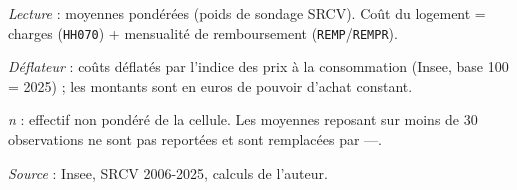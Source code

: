 \documentclass[12pt,a4paper]{article}
\begin{document}
\begin{table}[htbp]
\begin{threeparttable}
\begin{tablenotes}[flushleft]
				\item \textit{Lecture} : moyennes pondérées (poids de sondage SRCV). Coût du logement =
				charges (\texttt{HH070}) + mensualité de remboursement (\texttt{REMP}/\texttt{REMPR}).
				\item \textit{Déflateur} : coûts déflatés par l'indice des prix à la consommation (Insee, base 100 = 2025) ; les montants sont en euros de pouvoir d'achat constant.
				\item \textit{n} : effectif non pondéré de la cellule. Les moyennes reposant sur
				moins de 30 observations ne sont pas reportées et sont remplacées par ---.
				\item \textit{Source} : Insee, SRCV 2006-2025, calculs de l'auteur.
			\end{tablenotes}
		\end{threeparttable}
	\end{table}
	
\end{document}
